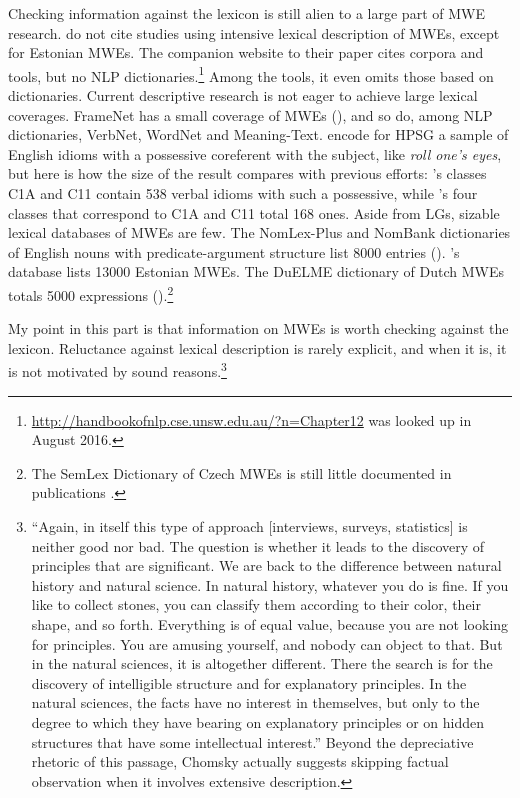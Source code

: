 \documentclass[output=paper]{langsci/langscibook}
\begin{document}
Checking information against the lexicon is still alien to a large part of MWE research. \citet{Baldwin2010} do not cite studies using intensive lexical description of MWEs, except for Estonian MWEs. The companion website to their paper cites corpora and tools, but no NLP  dictionaries.\footnote{\url{http://handbookofnlp.cse.unsw.edu.au/?n=Chapter12} was looked up in August 2016.}  Among the tools, it even omits those based on dictionaries. Current descriptive research is not eager to achieve large lexical coverages. FrameNet has a small coverage of MWEs (\citealt{Hartmann2013}), and so do, among NLP dictionaries, VerbNet, WordNet and Meaning-Text. \cite{Bond}  encode for HPSG  a sample of English idioms with a possessive coreferent with the subject, like \textit{roll one’s eyes}, but here is how the size of the result compares with previous efforts: \cite{Freckleton1985}'s classes C1A and C11 contain 538 verbal idioms with such a possessive, while \cite[64]{Bond}’s  four classes that correspond to C1A and C11 total 168 ones. 
Aside from LGs, sizable lexical databases of MWEs are few. The NomLex-Plus and NomBank dictionaries of English nouns with predicate-argument structure list 8000 entries (\citealt{Meyers2007}). \cite{Kaalep2008}'s database lists 13000  Estonian MWEs. The DuELME dictionary of  Dutch MWEs totals 5000 expressions (\citealt{Gregoire2010}).\footnote{The SemLex Dictionary of Czech MWEs is still little documented in publications \citep{Bejcek2010}.}

My point in this part is that information on MWEs is worth checking against the lexicon. Reluctance against lexical description is rarely explicit, and when it is, it is not motivated by sound reasons.\footnote{“Again, in itself this type of approach [interviews, surveys, statistics] is neither good nor bad. The question is whether it leads to the discovery of principles that are significant. We are back to the difference between natural history and natural science. In natural history, whatever you do is fine. If you like to collect stones, you can classify them according to their color, their shape, and so forth. Everything is of equal value, because you are not looking for principles. You are amusing yourself, and nobody can object to that. But in the natural sciences, it is altogether different. There the search is for the discovery of intelligible structure and for explanatory principles. In the natural sciences, the facts have no interest in themselves, but only to the degree to which they have bearing on explanatory principles or on hidden structures that have some intellectual interest.” \citep[58--59]{Chomsky1979} Beyond the depreciative rhetoric of this passage, Chomsky actually suggests skipping factual observation when it involves extensive description.}
\end{document}

